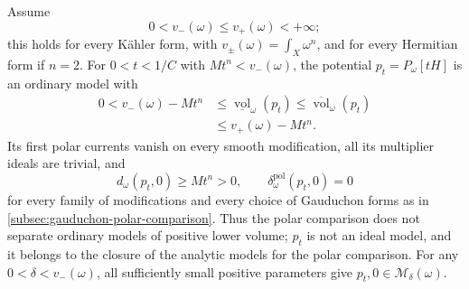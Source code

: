 \begin{proposition}\label{prop:all-modifications-diffuse-polar-blindness}\label{prop:diffuse-two-mass-model-obstruction}
Assume
\[
 0<v_-(\omega)\leq v_+(\omega)<+\infty;
\]
this holds for every K\"ahler form, with $v_\pm(\omega)=\int_X\omega^n$, and for every Hermitian form if $n=2$. For $0<t<1/C$ with $Mt^n<v_-(\omega)$, the potential $p_t=P_\omega[tH]$ is an ordinary model with
\[
 \begin{split}
 0<v_-(\omega)-Mt^n
 &\leq\underline{\operatorname{vol}}_\omega(p_t)
 \leq\overline{\operatorname{vol}}_\omega(p_t)\\
 &\leq v_+(\omega)-Mt^n.
 \end{split}
\]
Its first polar currents vanish on every smooth modification, all its multiplier ideals are trivial, and
\[
 d_\omega(p_t,0)\geq Mt^n>0,\qquad
 \delta_\omega^{\mathrm{pol}}(p_t,0)=0
\]
for every family of modifications and every choice of Gauduchon forms as in \cref{subsec:gauduchon-polar-comparison}. Thus the polar comparison does not separate ordinary models of positive lower volume; $p_t$ is not an ideal model, and it belongs to the closure of the analytic models for the polar comparison. For any $0<\delta<v_-(\omega)$, all sufficiently small positive parameters give $p_t,0\in\mathcal M_\delta(\omega)$.
\end{proposition}
